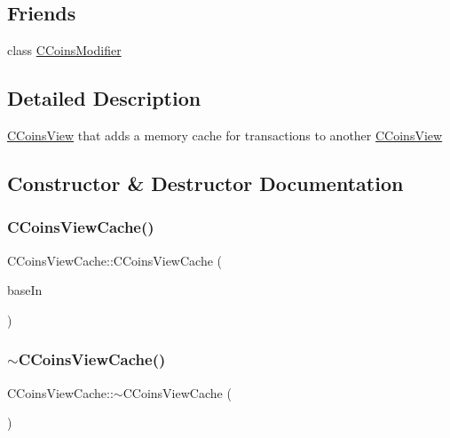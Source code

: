 \subsection*{Friends}
\begin{DoxyCompactItemize}
\item 
class \mbox{\hyperlink{class_c_coins_view_cache_ae6ce8219acb79950bced74cb108acacf}{C\+Coins\+Modifier}}
\end{DoxyCompactItemize}


\subsection{Detailed Description}
\mbox{\hyperlink{class_c_coins_view}{C\+Coins\+View}} that adds a memory cache for transactions to another \mbox{\hyperlink{class_c_coins_view}{C\+Coins\+View}} 

\subsection{Constructor \& Destructor Documentation}
\mbox{\label{class_c_coins_view_cache_a515a6f259af607fb3394b560d9c063c9}} 
\subsubsection{\texorpdfstring{C\+Coins\+View\+Cache()}{CCoinsViewCache()}\hspace{0.1cm}{\footnotesize\ttfamily [1/2]}}
{\footnotesize\ttfamily C\+Coins\+View\+Cache\+::\+C\+Coins\+View\+Cache (\begin{DoxyParamCaption}\item[{\mbox{\hyperlink{class_c_coins_view}{C\+Coins\+View}} $\ast$}]{base\+In }\end{DoxyParamCaption})}

\mbox{\label{class_c_coins_view_cache_a6148421cb7605fb434f6c8622f39430b}} 
\subsubsection{\texorpdfstring{$\sim$\+C\+Coins\+View\+Cache()}{~CCoinsViewCache()}}
{\footnotesize\ttfamily C\+Coins\+View\+Cache\+::$\sim$\+C\+Coins\+View\+Cache (\begin{DoxyParamCaption}{ }\end{DoxyParamCaption})}

